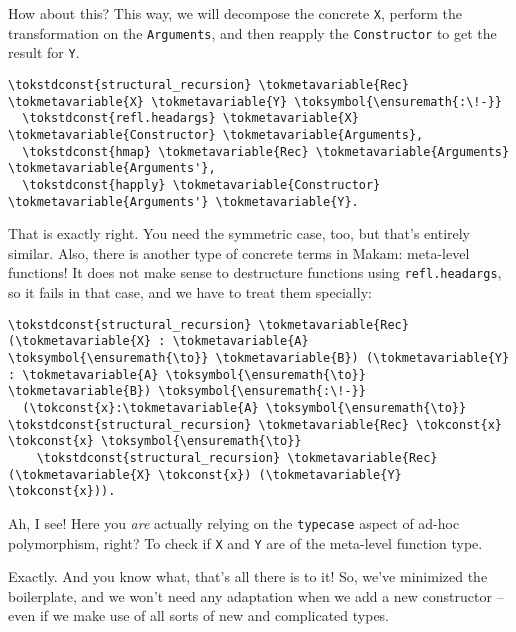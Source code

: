 \heroSTUDENT{} How about this? This way, we will decompose the concrete
\texttt{X}, perform the transformation on the \texttt{Arguments}, and
then reapply the \texttt{Constructor} to get the result for \texttt{Y}.

\importantCodeblock{}

\begin{verbatim}
\tokstdconst{structural_recursion} \tokmetavariable{Rec} \tokmetavariable{X} \tokmetavariable{Y} \toksymbol{\ensuremath{:\!-}}
  \tokstdconst{refl.headargs} \tokmetavariable{X} \tokmetavariable{Constructor} \tokmetavariable{Arguments},
  \tokstdconst{hmap} \tokmetavariable{Rec} \tokmetavariable{Arguments} \tokmetavariable{Arguments'},
  \tokstdconst{happly} \tokmetavariable{Constructor} \tokmetavariable{Arguments'} \tokmetavariable{Y}.
\end{verbatim}

\importantCodeblockEnd{}

\heroADVISOR{} That is exactly right. You need the symmetric case, too, but
that's entirely similar. Also, there is another type of concrete terms
in Makam: meta-level functions! It does not make sense to destructure
functions using \texttt{refl.headargs}, so it fails in that case, and we
have to treat them specially:

\importantCodeblock{}

\begin{verbatim}
\tokstdconst{structural_recursion} \tokmetavariable{Rec} (\tokmetavariable{X} : \tokmetavariable{A} \toksymbol{\ensuremath{\to}} \tokmetavariable{B}) (\tokmetavariable{Y} : \tokmetavariable{A} \toksymbol{\ensuremath{\to}} \tokmetavariable{B}) \toksymbol{\ensuremath{:\!-}}
  (\tokconst{x}:\tokmetavariable{A} \toksymbol{\ensuremath{\to}} \tokstdconst{structural_recursion} \tokmetavariable{Rec} \tokconst{x} \tokconst{x} \toksymbol{\ensuremath{\to}}
    \tokstdconst{structural_recursion} \tokmetavariable{Rec} (\tokmetavariable{X} \tokconst{x}) (\tokmetavariable{Y} \tokconst{x})).
\end{verbatim}

\importantCodeblockEnd{}

\heroSTUDENT{} Ah, I see! Here you \emph{are} actually relying on the
\texttt{typecase} aspect of ad-hoc polymorphism, right? To check if
\texttt{X} and \texttt{Y} are of the meta-level function type.

\heroADVISOR{} Exactly. And you know what, that's all there is to it! So,
we've minimized the boilerplate, and we won't need any adaptation when
we add a new constructor -- even if we make use of all sorts of new and
complicated types.


